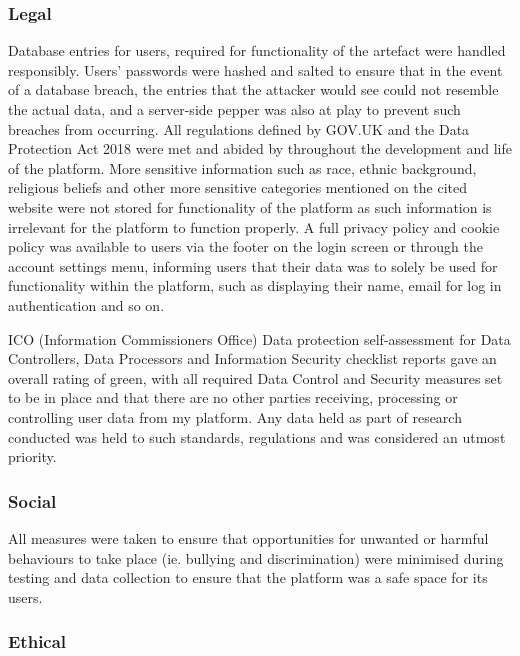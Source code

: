 \documentclass[lettersize,journal]{IEEEtran}
\begin{document}
	\subsubsection{Legal}
        Database entries for users, required for functionality of the artefact were handled responsibly. Users' passwords were hashed and salted to ensure that in
	the event of a database breach,	the entries that the attacker would see could not resemble the actual data, and a server-side pepper was also at play to
	prevent such breaches from occurring. All regulations defined by GOV.UK and the Data Protection Act 2018 \cite{Gov UK Data Protection} were met and abided by throughout
        the development and life of the platform. More sensitive information such as race, ethnic background, religious beliefs and other more
        sensitive categories mentioned on the cited website were not stored for functionality of the platform as such information
        is irrelevant for the platform to function properly. A full privacy policy and cookie policy was available to users via the footer on the login screen or
	through the account settings menu, informing users that their data was to solely be used for functionality within the platform, such as displaying
	their name, email for log in authentication and so on.

        ICO (Information Commissioners Office) \cite{ICO} Data protection self-assessment for Data Controllers, Data Processors and Information Security
        checklist reports gave an overall rating of green, with all required Data Control and Security measures set to be in place and that
        there are no other parties receiving, processing or controlling user data from my platform. Any data held as part of research conducted was held to such standards,
	regulations and was considered an utmost priority.
\\
        \subsubsection{Social}
                All measures were taken to ensure that opportunities for unwanted or harmful behaviours to take place (ie. bullying and discrimination)
                were minimised during testing and data collection to ensure that the platform was a safe space for its users.
\\
        \subsubsection{Ethical}
\end{document}
